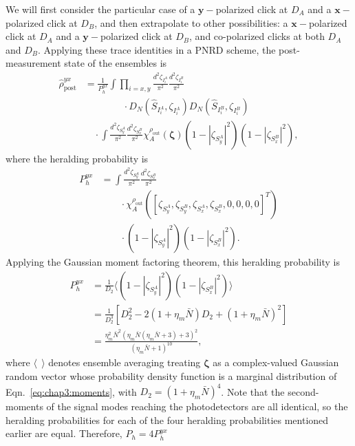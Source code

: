 \documentclass[aps,twocolumn,secnumarabic,amsmath,amssymb,pra,groupedaddress,
showpacs, showkeys]{revtex4-1}
\newcommand{\pna}[1]{\left(#1\right)}
\newcommand{\pnb}[1]{\left[#1\right]}
\begin{document}
We will first consider the particular case of a $\mathbf{y}-$polarized click at
$D_A$ and a $\mathbf{x}-$polarized click at $D_B$, and then extrapolate to
other possibilities: a $\mathbf{x}-$polarized click at $D_A$ and a
$\mathbf{y}-$polarized click at $D_B$, and co-polarized clicks at both $D_A$
and $D_B$. Applying these trace identities in a PNRD scheme, the
post-measurement state of the ensembles is
\begin{align}
\hat{\rho}_{\textrm{post}}^{yx}&=
\frac{1}{P_{h}^{yx}}\int 
\prod_{i=x,y}
\frac{d^2 \zeta_{I_i^A}}{\pi^2} 
\frac{d^2 \zeta_{I_i^B}}{\pi^2} \nonumber \\
& \qquad\qquad \cdot D_N\pna{\hat{S}_{I_i^A},\zeta_{I_i^A}} 
D_N\pna{\hat{S}_{I_i^B},\zeta_{I_i^B}}  \nonumber \\
& \quad \cdot \int 
\frac{d^2 \zeta_{S_y^A}}{\pi^2} 
\frac{d^2 \zeta_{S_x^B}}{\pi^2}
\chi_A^{\rho_{\textrm{out}}}\pna{\bm{\zeta}} \pna{1-|\zeta_{S_y^A}|^2}\pna{1-|\zeta_{S_x^B}|^2},
\end{align}
where the heralding probability is
\begin{align}
P_{h}^{yx} & =
\int 
\frac{d^2 \zeta_{S_y^A}}{\pi^2} 
\frac{d^2 \zeta_{S_x^B}}{\pi^2} \nonumber \\ 
& \qquad \cdot
\chi_A^{\rho_{\textrm{out}}}\pna{\pnb{\zeta_{S_y^A},\zeta_{S_y^B},\zeta_{S_x^A},\zeta_{S_x^B},0,0,0,0}^T}
\nonumber \\ 
& \qquad \cdot \pna{1-|\zeta_{S_y^A}|^2}\pna{1-|\zeta_{S_x^B}|^2}.
\end{align}
Applying the Gaussian moment factoring theorem, this heralding probability is
\begin{align}
P_{h}^{yx}&=\frac{1}{D_2}\langle \pna{1-|\zeta_{S_y^A}|^2}\pna{1-|\zeta_{S_x^B}|^2} \rangle \nonumber \\
	&=\frac{1}{D_2^3}\pnb{D_2^2-2\pna{1+\eta_{m}\bar{N}}D_2+\pna{1+\eta_{m}\bar{N}}^2} \nonumber \\
	& = \frac{\eta^2_{m} \bar{N}^2 (\eta_{m}  \bar{N} (\eta_{m}  \bar{N}+3)+3)^2}{(\eta_{m}  \bar{N}+1)^{10}},
\end{align}
where $\langle~~\rangle$ denotes ensemble averaging treating $\bm{\zeta}$ as a
complex-valued Gaussian random vector whose probability density function is a
marginal distribution of Eqn.~\ref{eq:chap3:moments}, with
$D_2=\pna{1+\eta_{m}\bar{N}}^4$. Note that the second-moments of
the signal modes reaching the photodetectors are all identical, so the
heralding probabilities for each of the four heralding probabilities mentioned
earlier are equal. Therefore, $P_{h}=4P_{h}^{yx}$
\end{document}
